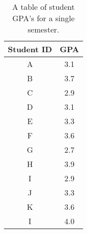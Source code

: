 \documentclass{article}
\begin{document}
\begin{table}[hb]
\centering
\begin{tabular}{| c | c |}
\hline \hline
Student ID & GPA \\ \hline
A & 3.1 \\ \hline
B & 3.7 \\ \hline
C & 2.9 \\ \hline
D & 3.1 \\ \hline
E & 3.3 \\ \hline
F & 3.6 \\ \hline
G & 2.7 \\ \hline
H & 3.9 \\ \hline
I & 2.9 \\ \hline
J & 3.3 \\ \hline
K & 3.6 \\ \hline
I & 4.0 \\ \hline
\hline
\end{tabular}
\caption{\label{tab:gpa} A table of student GPA's for a single semester.}
\end{table}
\end{document}
